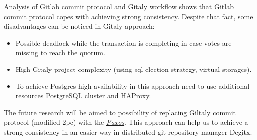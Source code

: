 \documentclass[acmlarge, screen, nonacm]{acmart}
\begin{document}
Analysis of Gitlab commit protocol and Gitaly workflow shows that Gitlab commit protocol 
copes with achieving strong consistency. Despite that 
fact, some disadvantages can be noticed in Gitaly approach:
\begin{itemize}
\item Possible deadlock while the transaction is completing in case votes are missing to reach the quorum.
\item High Gitaly project complexity (using sql election strategy, virtual storages).
\item To achieve Postgres high availability in this approach need to use additional resources PostgreSQL cluster and HAProxy. 
\end{itemize}
The future research will be aimed to possibility of replacing Giltaly commit protocol (modified 2pc) 
with the \emph{\href{https://en.wikipedia.org/wiki/Paxos_(computer_science)}{Paxos}}. This approach can help us to achieve 
a strong consistency in an easier way in distributed git repository manager Degitx.
\end{document}
